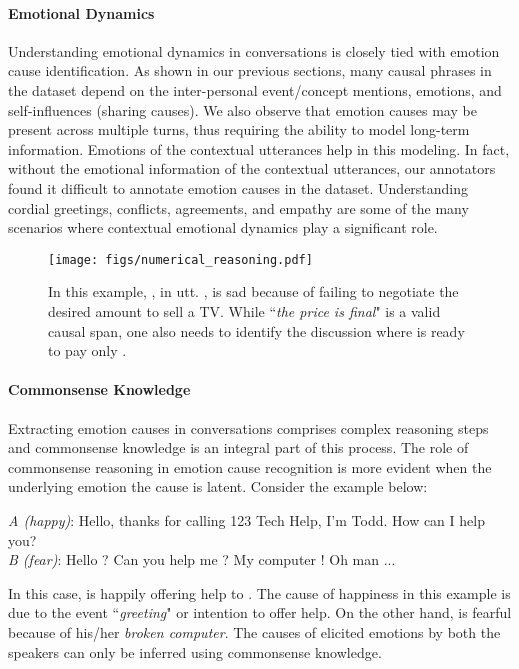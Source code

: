 \documentclass[11pt,a4paper]{article}
\theoremstyle{definition}
\begin{document}
\paragraph{Emotional Dynamics} Understanding emotional dynamics in conversations is closely tied with emotion cause identification. As shown in our previous sections, many causal phrases in the dataset depend on the inter-personal event/concept mentions, emotions, and self-influences (sharing causes). We also observe that emotion causes may be present across multiple turns, thus requiring the ability to model long-term information. Emotions of the contextual utterances help in this modeling. In fact, without the emotional information of the contextual utterances, our annotators found it difficult to annotate emotion causes in the dataset. Understanding cordial greetings, conflicts, agreements, and empathy are some of the many scenarios where contextual emotional dynamics play a significant role. 








\begin{figure}[t!]
    \centering
    \texttt{[image: figs/numerical\_reasoning.pdf]}
    \caption{\footnotesize{In this example, , in utt. , is sad because of failing to negotiate the desired amount to sell a TV. While ``\textit{the price is final}" is a valid causal span, one also needs to identify the discussion where  is ready to pay only .}}
    \label{fig:numerical_reasoning}
\end{figure}

\paragraph{Commonsense Knowledge} Extracting emotion causes in conversations comprises complex reasoning steps and commonsense knowledge is an integral part of this process. The role of commonsense reasoning in emotion cause recognition is more evident when the underlying emotion the cause is latent. Consider the example below:

\begin{exe}
\ex \textit{A (happy)}: Hello, thanks for calling 123 Tech Help, I'm Todd. How can I help you?\\
\textit{B (fear)}: Hello ? Can you help me ? My computer ! Oh man ...
\label{ex:latent}
\end{exe}

In this case,  is happily offering help to . The cause of happiness in this example is due to the event ``\textit{greeting}" or intention to offer help. On the other hand,  is fearful because of his/her \textit{broken computer}. The causes of elicited emotions by both the speakers can only be inferred using commonsense knowledge.
\end{document}

